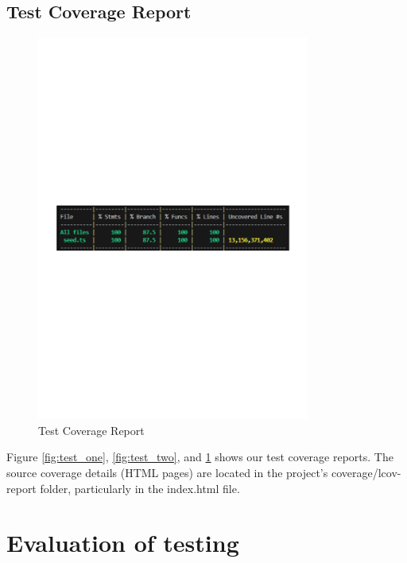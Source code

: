 \subsection{Test Coverage Report} \label{sect:test-coverage} 
\begin{figure}[H]
    \centering
    \includegraphics[width=0.8\textwidth]{resources/test_three.pdf}
    \caption{Test Coverage Report}
    \label{fig:test_three}
\end{figure}

Figure \ref{fig:test_one}, \ref{fig:test_two}, and \ref{fig:test_three} shows our test coverage reports. The source coverage details (HTML pages) are located in the project’s coverage/lcov-report folder, particularly in the index.html file. 


\section{Evaluation of testing} \label{sect:testing:evaluation}

